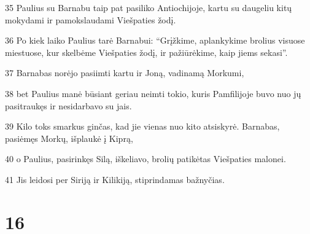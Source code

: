 \par 35 Paulius su Barnabu taip pat pasiliko Antiochijoje, kartu su daugeliu kitų mokydami ir pamokslaudami Viešpaties žodį. 
\par 36 Po kiek laiko Paulius tarė Barnabui: “Grįžkime, aplankykime brolius visuose miestuose, kur skelbėme Viešpaties žodį, ir pažiūrėkime, kaip jiems sekasi”. 
\par 37 Barnabas norėjo pasiimti kartu ir Joną, vadinamą Morkumi, 
\par 38 bet Paulius manė būsiant geriau neimti tokio, kuris Pamfilijoje buvo nuo jų pasitraukęs ir nesidarbavo su jais. 
\par 39 Kilo toks smarkus ginčas, kad jie vienas nuo kito atsiskyrė. Barnabas, pasiėmęs Morkų, išplaukė į Kiprą, 
\par 40 o Paulius, pasirinkęs Silą, iškeliavo, brolių patikėtas Viešpaties malonei. 
\par 41 Jis leidosi per Siriją ir Kilikiją, stiprindamas bažnyčias.


\chapter{16}


